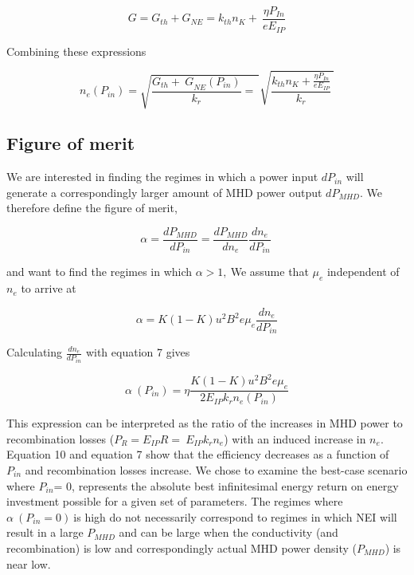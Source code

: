 \begin{equation}
G = G_{th} + G_{NE} = k_{th}n_{K} + \ \frac{\eta P_{In}}{eE_{IP}}
\end{equation}

Combining these expressions

\begin{equation}
n_{e}(P_{in}) = \sqrt{\frac{{G_{th} + \ G}_{NE}(P_{in})}{k_{r}} = \ }\sqrt{\frac{k_{th}n_{K} + \frac{\eta P_{In}}{eE_{IP}}}{k_{r}}\ }
\end{equation}

\hypertarget{figure-of-merit}{%
\subsection{Figure of merit}\label{figure-of-merit}}

We are interested in finding the regimes in which a power input \(dP_{in}\) will generate a correspondingly larger amount of MHD power output \(dP_{MHD}\). We therefore define the figure of merit,

\begin{equation}
\alpha = \frac{{dP}_{MHD}}{dP_{in}} = \frac{{dP}_{MHD}}{dn_{e}}\frac{dn_{e}}{dP_{in}}\ 
\end{equation}


and want to find the regimes in which \(\alpha > 1,\ \)We assume that \(\mu_{e}\) independent of \(n_{e}\) to arrive at

\begin{equation}
\alpha = K(1 - K)u^{2}B^{2}e\mu_{e}\frac{dn_{e}}{dP_{in}}
\end{equation}


Calculating \(\frac{dn_{e}}{dP_{in}}\) with equation 7 gives

\begin{equation}
\alpha\ (P_{in}) = \eta\frac{K(1 - K)u^{2}B^{2}e\mu_{e}}{2E_{IP}k_{r}n_{e}(P_{in})}
\end{equation}


This expression can be interpreted as the ratio of the increases in MHD power to recombination losses (\(P_{R} = E_{IP}R = \ E_{IP}k_{r}n_{e}\)) with an induced increase in \(n_{e}\). Equation 10 and equation 7 show that the efficiency decreases as a function of \(P_{in}\) and recombination losses increase. We chose to examine the best-case scenario where \(P_{in}\)= 0, represents the absolute best infinitesimal energy return on energy investment possible for a given set of parameters. The regimes where \(\alpha\ \left( P_{in} = 0 \right)\ \)is high do not necessarily correspond to regimes in which NEI will result in a large \(P_{MHD}\) and can be large when the conductivity (and recombination) is low and correspondingly actual MHD power density (\(P_{MHD}\)) is near low.


